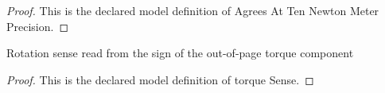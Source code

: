 \begin{proof}
  This is the declared model definition of Agrees At Ten Newton Meter Precision.
\end{proof}
\begin{definition}
  \label{def:physics:phyx-mini-0823:phyxminiproblems-problemphyxmini0823-torquesense-value}
  Rotation sense read from the sign of the out-of-page torque component
\end{definition}
\begin{proof}
  This is the declared model definition of torque Sense.
\end{proof}
